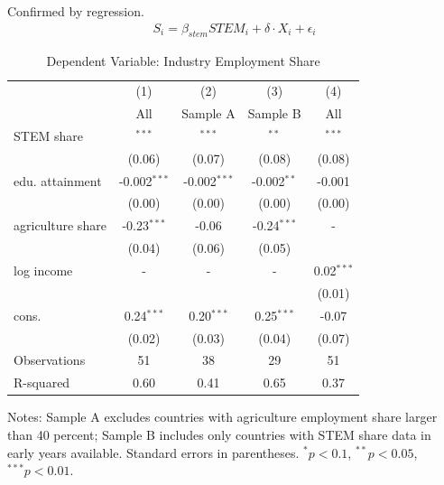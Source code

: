 \documentclass[9pt,xcolor={svgnames}]{beamer}
\begin{document}
\begin{frame}{Confirmed by regression.}
\vspace{-1em}
\begin{align*}\label{regression}
    S_i = \beta_{stem} STEM_i + \delta \cdot X_i + \epsilon_i
\end{align*}

\vspace{-1em}

\begin{table}[htbp]
\centering
\begin{threeparttable}
\caption{Dependent Variable: Industry Employment Share}
\begin{tabular}{lcccc}
\toprule
 & (1) & (2) & (3) & (4) \\
 & All &  Sample A & Sample B & All \\
\midrule
STEM share & \color{red}{0.26}$^{***}$ & \color{red}{0.29}$^{***}$ & \color{red}{0.19}$^{**}$  & \color{red}{0.29}$^{***}$ \\
          & (0.06)       & (0.07)      & (0.08)    &(0.08) \\
edu. attainment & -0.002$^{***}$ & -0.002$^{***}$ & -0.002$^{**}$ & -0.001 \\
          & (0.00)       & (0.00)       & (0.00)    & (0.00) \\
agriculture share & -0.23$^{***}$       & -0.06       & -0.24$^{***}$  & -    \\
          & (0.04)       & (0.06)       & (0.05)     \\
  log income & -       & -      &  - &  0.02$^{***}$    \\
          &        &       &   & (0.01)    \\        
cons. & 0.24$^{***}$       & 0.20$^{***}$        & 0.25$^{***}$  & -0.07     \\
          & (0.02)       & (0.03)       & (0.04)    & (0.07) \\ 
\midrule
Observations & 51 & 38 & 29 & 51 \\
R-squared    & 0.60 & 0.41 & 0.65 & 0.37 \\
\bottomrule
\end{tabular}
\begin{tablenotes}
\small
\item Notes: Sample A excludes countries with agriculture employment share larger than 40 percent; Sample B includes only countries with STEM share data in early years available.
Standard errors in parentheses. $^{*}p<0.1$, $^{**}p<0.05$, $^{***}p<0.01$.
\end{tablenotes}
\end{threeparttable}
\end{table}
\end{frame}
\end{document}
